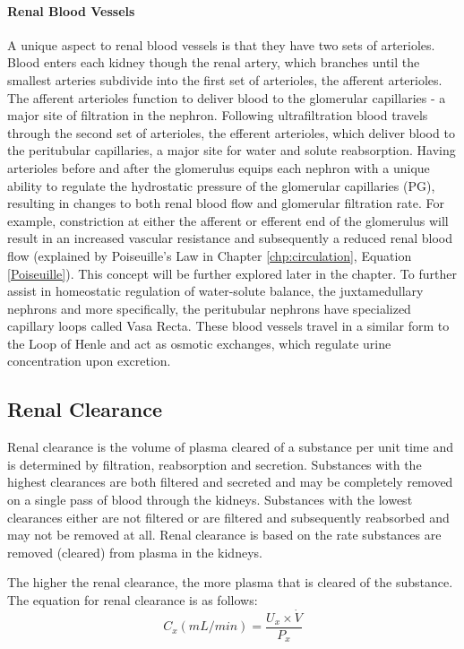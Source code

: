 \paragraph{Renal Blood Vessels}
A unique aspect to renal blood vessels is that they have two sets of arterioles. Blood enters each kidney though the renal artery, which branches until the smallest arteries subdivide into the first set of arterioles, the afferent arterioles. The afferent arterioles function to deliver blood to the glomerular capillaries - a major site of filtration in the nephron. Following ultrafiltration blood travels through the second set of arterioles, the efferent arterioles, which deliver blood to the peritubular capillaries, a major site for water and solute reabsorption. Having arterioles before and after the glomerulus equips each nephron with a unique ability to regulate the hydrostatic pressure of the glomerular capillaries (PG), resulting in changes to both renal blood flow and glomerular filtration rate. For example, constriction at either the afferent or efferent end of the glomerulus will result in an increased vascular resistance and subsequently a reduced renal blood flow (explained by Poiseuille’s Law in Chapter \ref{chp:circulation}, Equation \ref{Poiseuille}). This concept will be further explored later in the chapter. 
To further assist in homeostatic regulation of water-solute balance, the juxtamedullary nephrons and more specifically, the peritubular nephrons have specialized capillary loops called Vasa Recta. These blood vessels travel in a similar form to the Loop of Henle and act as osmotic exchanges, which regulate urine concentration upon excretion. 


\subsection{Renal Clearance}

Renal clearance is the volume of plasma cleared of a substance per unit time and is determined by filtration, reabsorption and secretion. Substances with the highest clearances are both filtered and secreted and may be completely removed on a single pass of blood through the kidneys. Substances with the lowest clearances either are not filtered or are filtered and subsequently reabsorbed and may not be removed at all.  Renal clearance is based on the rate substances are removed (cleared) from plasma in the kidneys.

The higher the renal clearance, the more plasma that is cleared of the substance. The equation for renal clearance is as follows:
\vspace{4mm}
\begin{equation}
    C_x (mL/min) = \frac{U_x \times \dot{V}}{P_x}
    \label{renal_clearance}
\end{equation}

